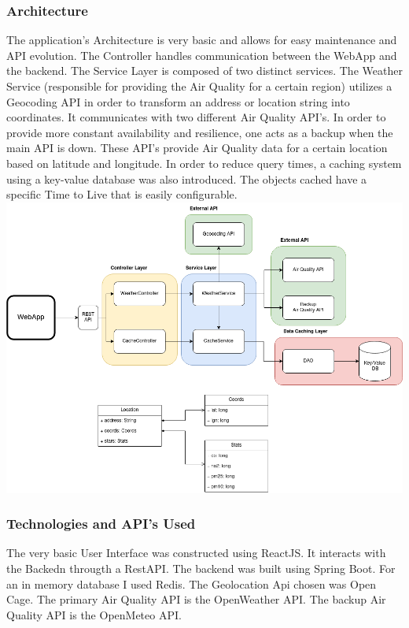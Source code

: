 \documentclass[12pt]{article}
\begin{document}
\subsubsection{Architecture}
The application's Architecture is very basic and allows for easy maintenance and API evolution. The Controller handles communication between the WebApp and the backend. The Service Layer is composed of two distinct services. The Weather Service (responsible for providing the Air Quality for a certain region) utilizes a Geocoding API in order to transform an address or location string into coordinates. It communicates with two different Air Quality API's. In order to provide more constant availability and resilience, one acts as a backup when the main API is down. These API's provide Air Quality data for a certain location based on latitude and longitude.
In order to reduce query times, a caching system using a key-value database was also introduced. The objects cached have a specific Time to Live that is easily configurable.
\includegraphics[scale=.4]{architecture.png}

\subsubsection{Technologies and API's Used}

The very basic User Interface was constructed using ReactJS. It interacts with the Backedn througth a RestAPI. The backend was built using Spring Boot. For an in memory database I used Redis. The Geolocation Api chosen was Open Cage. The primary Air Quality API is the OpenWeather API. The backup Air Quality API is the OpenMeteo API.
\end{document}
